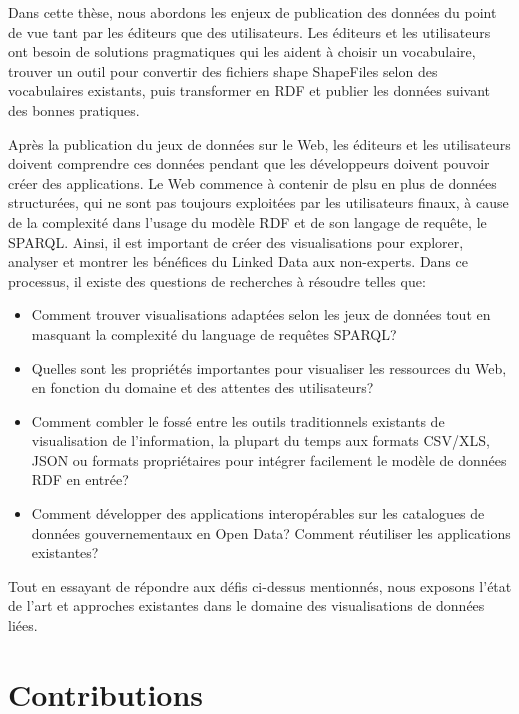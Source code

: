 \documentclass[a4paper,11pt,twoside]{report}
\begin{document}
Dans cette thèse, nous abordons les enjeux de publication des données du point de vue tant par les éditeurs que des utilisateurs. Les éditeurs et les utilisateurs ont besoin de solutions pragmatiques qui les aident à choisir un vocabulaire, trouver un outil pour convertir des fichiers shape  ShapeFiles selon des vocabulaires existants, puis transformer en RDF et publier les données suivant des bonnes pratiques.

 
Après la publication du jeux de données sur le Web, les éditeurs et les utilisateurs doivent comprendre ces données pendant que les développeurs doivent pouvoir créer des applications. Le Web commence à contenir de plsu en plus de données structurées, qui ne sont pas toujours exploitées par les utilisateurs finaux, à cause de la complexité dans l'usage du modèle RDF et de son langage de requête, le SPARQL. Ainsi, il est important de créer des visualisations pour explorer, analyser et montrer les bénéfices du Linked Data aux non-experts. Dans ce processus, il existe des questions de recherches à résoudre telles que:

\begin{itemize}
\item Comment trouver visualisations adaptées selon les jeux de données tout en masquant la complexité du language de requêtes SPARQL?

 \item  Quelles sont les propriétés importantes pour visualiser les ressources du Web, en fonction du domaine et des attentes des utilisateurs?
 
 \item  Comment combler le fossé entre les outils traditionnels existants de visualisation de l'information, la plupart du temps aux formats CSV/XLS, JSON ou formats propriétaires pour intégrer facilement le modèle de données RDF en entrée?
 
 \item Comment développer des applications interopérables sur les catalogues de données gouvernementaux en  Open Data? Comment réutiliser les applications existantes?
 
\end{itemize}
 
 
Tout en essayant de répondre aux défis ci-dessus mentionnés, nous exposons  l'état de l'art et approches existantes dans le domaine des visualisations de données liées.

\section*{Contributions}
\label{sec:contributions}
\end{document}
